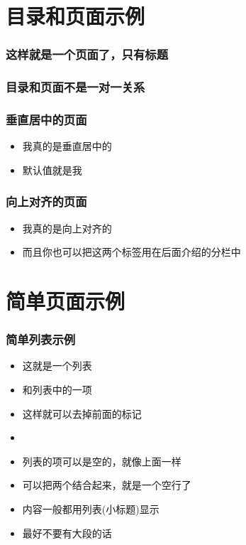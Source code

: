 \documentclass[17pt]{beamer}
\begin{document}
    \section{目录和页面示例} %

    \begin{frame}
        \frametitle{这样就是一个页面了，只有标题}
    \end{frame}

    \begin{frame}
        \frametitle{目录和页面不是一对一关系}
    \end{frame}

    \begin{frame}[c]
        \frametitle{垂直居中的页面}
        \begin{itemize}
            \item 我真的是垂直居中的
            \item 默认值就是我
        \end{itemize}
    \end{frame}

    \begin{frame}[t]
        \frametitle{向上对齐的页面}
        \begin{itemize}
            \item 我真的是向上对齐的
            \item 而且你也可以把这两个标签用在后面介绍的分栏中
        \end{itemize}
    \end{frame}

    \section{简单页面示例}

    \begin{frame}
        \frametitle{简单列表示例} 

        \begin{itemize}
            \item 这就是一个列表
            \item 和列表中的一项
            \item[] 这样就可以去掉前面的标记
            \item
            \item 列表的项可以是空的，就像上面一样
            \item 可以把两个结合起来，就是一个空行了
            \item 内容一般都用列表(小标题)显示
            \item 最好不要有大段的话
        \end{itemize}
    \end{frame}
\end{document}
